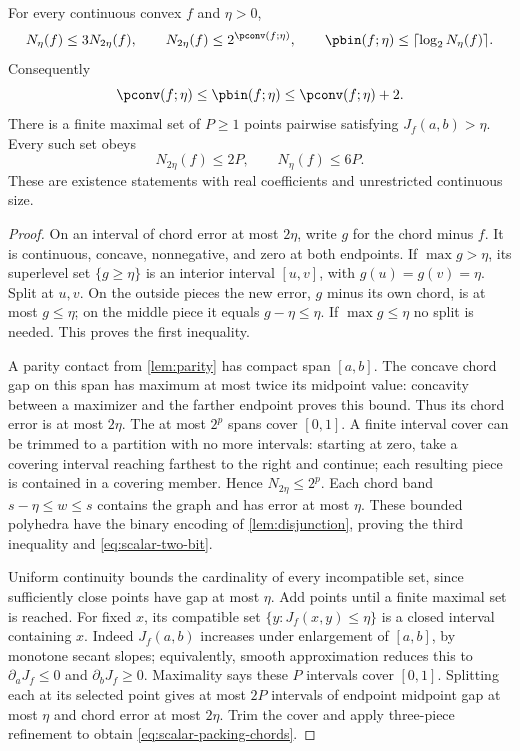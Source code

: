 \begin{lemma}\label{lem:scalar-chords}
For every continuous convex $f$ and $\eta>0$,
\begin{equation}\label{eq:scalar-chord-counts}
 N_\eta(f)\le3N_{2\eta}(f),\qquad
 N_{2\eta}(f)\le2^{\pconv(f;\eta)},\qquad
 \pbin(f;\eta)\le\lceil\log_2N_\eta(f)\rceil.
\end{equation}
Consequently
\begin{equation}\label{eq:scalar-two-bit}
 \pconv(f;\eta)\le\pbin(f;\eta)\le\pconv(f;\eta)+2.
\end{equation}
There is a finite maximal set of $P\ge1$ points pairwise satisfying
$J_f(a,b)>\eta$. Every such set obeys
\begin{equation}\label{eq:scalar-packing-chords}
 N_{2\eta}(f)\le2P,\qquad N_\eta(f)\le6P.
\end{equation}
These are existence statements with real coefficients and unrestricted
continuous size.
\end{lemma}
\begin{proof}
On an interval of chord error at most $2\eta$, write $g$ for the chord
minus $f$. It is continuous, concave, nonnegative, and zero at both
endpoints. If $\max g>\eta$, its superlevel set $\{g\ge\eta\}$ is an
interior interval $[u,v]$, with $g(u)=g(v)=\eta$. Split at $u,v$.
On the outside pieces the new error, $g$ minus its own chord, is at
most $g\le\eta$; on the middle piece it equals $g-\eta\le\eta$.
If $\max g\le\eta$ no split is needed. This proves the first inequality.

A parity contact from \cref{lem:parity} has compact span $[a,b]$.
The concave chord gap on this span has maximum at most twice its
midpoint value: concavity between a maximizer and the farther endpoint
proves this bound. Thus its chord error is at most $2\eta$.
The at most $2^p$ spans cover $[0,1]$. A finite interval cover can be
trimmed to a partition with no more intervals: starting at zero, take
a covering interval reaching farthest to the right and continue;
each resulting piece is contained in a covering member. Hence
$N_{2\eta}\le2^p$. Each chord band $s-\eta\le w\le s$ contains
the graph and has error at most $\eta$. These bounded polyhedra have
the binary encoding of \cref{lem:disjunction}, proving the third
inequality and \eqref{eq:scalar-two-bit}.

Uniform continuity bounds the cardinality of every incompatible set,
since sufficiently close points have gap at most $\eta$. Add points
until a finite maximal set is reached. For fixed $x$, its compatible
set $\{y:J_f(x,y)\le\eta\}$ is a closed interval containing $x$.
Indeed $J_f(a,b)$ increases under enlargement of $[a,b]$, by monotone
secant slopes; equivalently, smooth approximation reduces this to
$\partial_aJ_f\le0$ and $\partial_bJ_f\ge0$. Maximality says these
$P$ intervals cover $[0,1]$. Splitting each at its selected point gives
at most $2P$ intervals of endpoint midpoint gap at most $\eta$ and
chord error at most $2\eta$. Trim the cover and apply three-piece
refinement to obtain \eqref{eq:scalar-packing-chords}.
\end{proof}

